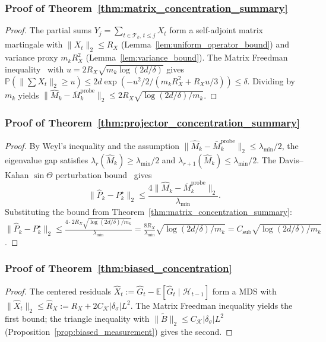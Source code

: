 \documentclass{article}
\newcommand{\E}{\mathbb{E}}
\newcommand{\Prob}{\mathbb{P}}
\newcommand{\cH}{\mathcal{H}}
\newcommand{\cT}{\mathcal{T}}
\begin{document}
\subsubsection{Proof of Theorem~\ref{thm:matrix_concentration_summary}}
\label{proof:matrix_concentration}

\begin{proof}
The partial sums $Y_j = \sum_{t \in \cT_k,\, t \le j} X_t$ form a self-adjoint matrix martingale with $\|X_t\|_2 \le R_X$ (Lemma~\ref{lem:uniform_operator_bound}) and variance proxy $m_k R_X^2$ (Lemma~\ref{lem:variance_bound}).
The Matrix Freedman inequality~\citep{tropp2012user} with $u = 2R_X\sqrt{m_k\log(2d/\delta)}$ gives
$\Prob(\|\sum X_t\|_2 \ge u) \le 2d\exp(-u^2/2/(m_k R_X^2 + R_X u/3)) \le \delta$.
Dividing by $m_k$ yields $\|\widehat{M}_k - \bar{M}_k^{\mathrm{probe}}\|_2 \le 2R_X\sqrt{\log(2d/\delta)/m_k}$.
\end{proof}

\subsubsection{Proof of Theorem~\ref{thm:projector_concentration_summary}}
\label{proof:projector_concentration}

\begin{proof}
By Weyl's inequality and the assumption $\|\widehat M_k - \bar M_k^{\mathrm{probe}}\|_2 \le \lambda_{\min}/2$, the eigenvalue gap satisfies $\lambda_r(\widehat{M}_k) \ge \lambda_{\min}/2$ and $\lambda_{r+1}(\widehat{M}_k) \le \lambda_{\min}/2$.
The Davis--Kahan $\sin\Theta$ perturbation bound~\citep{davis1970rotation,yu2015useful} gives
\[
\|\widehat{P}_k - P_k^\star\|_2 \le \frac{4\|\widehat M_k - \bar M_k^{\mathrm{probe}}\|_2}{\lambda_{\min}}.
\]
Substituting the bound from Theorem~\ref{thm:matrix_concentration_summary}:
$\|\widehat{P}_k - P_k^\star\|_2 \le \frac{4 \cdot 2R_X\sqrt{\log(2d/\delta)/m_k}}{\lambda_{\min}} = \frac{8R_X}{\lambda_{\min}}\sqrt{\log(2d/\delta)/m_k} = C_{\mathrm{sub}}\sqrt{\log(2d/\delta)/m_k}$.
\end{proof}

\subsubsection{Proof of Theorem~\ref{thm:biased_concentration}}
\label{proof:biased_concentration}

\begin{proof}
The centered residuals $\hat X_t := \hat G_t - \E[\hat G_t \mid \cH_{t-1}]$ form a MDS with $\|\hat X_t\|_2 \le \hat R_X := R_X + 2C_{\mathcal K}|\delta_\sigma|L^2$.
The Matrix Freedman inequality yields the first bound; the triangle inequality with $\|\widetilde B\|_2 \le C_{\mathcal K}|\delta_\sigma|L^2$ (Proposition~\ref{prop:biased_measurement}) gives the second.
\end{proof}
\end{document}
